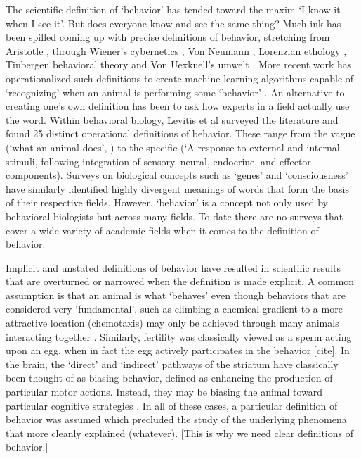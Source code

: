 \documentclass[a4paper, 11pt]{article}
\begin{document}
The scientific definition of `behavior' has tended toward the maxim `I know it when I see it'. But does everyone know and see the same thing? Much ink has been spilled coming up with precise definitions of behavior, stretching from Aristotle \cite{aristotle}, through Wiener's cybernetics \cite{wiener2019cybernetics}, Von Neumann \cite{von2012computer}, Lorenzian ethology \cite{lorenz2013foundations}, Tinbergen behavioral theory \cite{tinbergen1972animal} and Von Uexkuell's umwelt \cite{uexkull1921umwelt}. More recent work has operationalized such definitions to create machine learning algorithms capable of `recognizing' when an animal is performing some `behavior' \cite{berman2014mapping,wiltschko2015mapping,calhoun2019unsupervised}. An alternative to creating one's own definition has been to ask how experts in a field actually use the word. Within behavioral biology, Levitis et al \cite{levitis2009behavioural} surveyed the literature and found 25 distinct operational definitions of behavior. These range from the vague (`what an animal does', \cite{davis1966integral}) to the specific (`A response to external and internal stimuli, following integration of sensory, neural, endocrine, and effector components). Surveys on biological concepts such as `genes' and `consciousness' \cite{consciousness-2021,stotz2004biologists} have similarly identified highly divergent meanings of words that form the basis of their respective fields. However, `behavior' is a concept not only used by behavioral biologists but across many fields. To date there are no surveys that cover a wide variety of academic fields when it comes to the definition of behavior.

Implicit and unstated definitions of behavior have resulted in scientific results that are overturned or narrowed when the definition is made explicit. A common assumption is that an animal is what `behaves' even though behaviors that are considered very `fundamental', such as climbing a chemical gradient to a more attractive location (chemotaxis) may only be achieved through many animals interacting together \cite{ramdya2014group}. Similarly, fertility was classically viewed as a sperm acting upon an egg, when in fact the egg actively participates in the behavior [cite]. In the brain, the `direct' and `indirect' pathways of the striatum have classically been thought of as biasing behavior, defined as enhancing the production of particular motor actions. Instead, they may be biasing the animal toward particular cognitive strategies \cite{bolkan2021strong}. In all of these cases, a particular definition of behavior was assumed which precluded the study of the underlying phenomena that more cleanly explained (whatever). [This is why we need clear definitions of behavior.]
\end{document}
